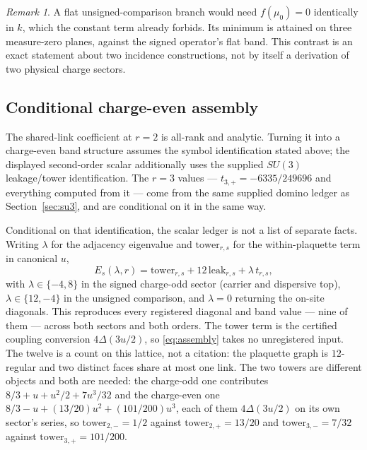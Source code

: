 \documentclass[11pt]{article}
\theoremstyle{plain}
\theoremstyle{definition}
\theoremstyle{remark}
\newtheorem{remark}[theorem]{Remark}
\newcommand{\chk}[1]{}
\begin{document}
\begin{remark}
A flat unsigned-comparison branch would need $f(\mu_0)=0$ identically in $k$,
which the constant term already forbids. Its minimum is attained on three
measure-zero planes, against the signed operator's flat band. This contrast is
an exact statement about two incidence constructions, not by itself a
derivation of two physical charge sectors.
\chk{the C-even band touches its floor exactly on the three planes k\_j = pi}
\chk{the C-even spectra at the four high-symmetry momenta}
\end{remark}

\subsection{Conditional charge-even assembly}

The shared-link coefficient at $r=2$ is all-rank and analytic. Turning it into
a charge-even band structure assumes the symbol identification stated above;
the displayed second-order scalar additionally uses the supplied
$SU(3)$ leakage/tower identification. The $r=3$ values ---
$t_{3,+}=-6335/249696$ and everything computed from it --- come from the same
supplied domino ledger as Section~\ref{sec:su3}, and are conditional on it in
the same way.

Conditional on that identification, the scalar ledger is not a list of
separate facts. Writing $\lambda$ for the
adjacency eigenvalue and $\mathrm{tower}_{r,s}$ for the within-plaquette term
in canonical $u$,
\begin{equation}\label{eq:assembly}
  E_s(\lambda,r)=\mathrm{tower}_{r,s}+12\,\mathrm{leak}_{r,s}+\lambda\,t_{r,s},
\end{equation}
with $\lambda\in\{-4,8\}$ in the signed charge-odd sector (carrier and dispersive
top), $\lambda\in\{12,-4\}$ in the unsigned comparison, and $\lambda=0$
returning the on-site diagonals. This reproduces every registered diagonal
and band value --- nine of them --- across both sectors and both orders. The
tower term is the certified coupling conversion $4\Delta(3u/2)$, so
\eqref{eq:assembly} takes no unregistered input. The twelve is a count on this
lattice, not a citation: the plaquette graph is $12$-regular and two distinct
faces share at most one link. The two towers are different objects and both
are needed: the charge-odd one contributes
$8/3+u+u^2/2+7u^3/32$ and the charge-even one $8/3-u+(13/20)u^2+(101/200)u^3$,
each of them $4\Delta(3u/2)$ on its own sector's series, so
$\mathrm{tower}_{2,-}=1/2$ against $\mathrm{tower}_{2,+}=13/20$ and
$\mathrm{tower}_{3,-}=7/32$ against $\mathrm{tower}_{3,+}=101/200$.
\chk{one assembly formula gives every registered band value}
\chk{one assembly formula gives every C-even value at both orders}
\chk{the plaquette graph is 12-regular and two faces share at most one link}
\end{document}
